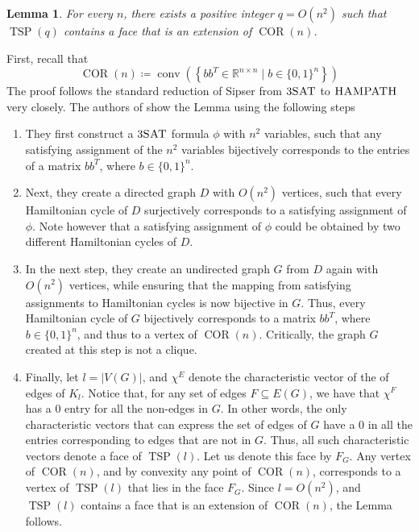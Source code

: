 \documentclass{article}
\newtheorem{lemma}[theorem]{\sc Lemma}
\theoremstyle{definition}
\theoremstyle{remark}
\newenvironment{proofsketch}{%
  \renewcommand{\proofname}{Proof Sketch}\proof}{\endproof}
\newcommand{\conv}{\operatorname{conv}}
\newcommand{\TSP}{\operatorname{TSP}}
\newcommand{\COR}{\operatorname{COR}}
\renewcommand{\R}{\mathbb{R}}
\def\problem#1{\textsc{#1}}
\def\HAMPATH{\problem{HAMPATH}\xspace}
\def\THREESAT{\problem{$3$SAT}\xspace}
\begin{document}
\begin{lemma}\label{lem:tsp-reduct}
For every $n$, there exists a positive integer $q = O(n^2)$ such that $\TSP(q)$ contains a face that is an extension of $\COR(n)$.
\end{lemma}
\begin{proofsketch}
First, recall that
\[
\COR(n) \coloneqq \conv\left( \left\{ bb^T \in \R^{n \times n} \mid b \in {\{0, 1\}}^n \right\} \right)
\]
The proof follows the standard reduction of Sipser \cite{sipser} from $\THREESAT$ to $\HAMPATH$ very closely. The authors of \cite{fiorini} show the Lemma using the following steps
\begin{enumerate}
\item They first construct a $\THREESAT$ formula $\phi$ with $n^2$ variables, such that any satisfying assignment of the $n^2$ variables bijectively corresponds to the entries of a matrix $b b^T$, where $b \in {\{0, 1\}}^n$.

\item Next, they create a directed graph $D$ with $O(n^2)$ vertices, such that every Hamiltonian cycle of $D$ surjectively corresponds to a satisfying assignment of $\phi$. Note however that a satisfying assignment of $\phi$ could be obtained by two different Hamiltonian cycles of $D$.

\item In the next step, they create an undirected graph $G$ from $D$ again with $O(n^2)$ vertices, while ensuring that the mapping from satisfying assignments to Hamiltonian cycles is now bijective in $G$. Thus, every Hamiltonian cycle of $G$ bijectively corresponds to a matrix $b b^T$, where $b \in {\{0, 1\}}^n$, and thus to a vertex of $\COR(n)$. Critically, the graph $G$ created at this step is not a clique.

\item Finally, let $l = |V(G)|$, and $\chi^E$ denote the characteristic vector of the of edges of $K_l$. Notice that, for any set of edges $F \subseteq E(G)$, we have that $\chi^F$ has a $0$ entry for all the non-edges in $G$. In other words, the only characteristic vectors that can express the set of edges of $G$ have a $0$ in all the entries corresponding to edges that are not in $G$. Thus, all such characteristic vectors denote a face of $\TSP(l)$. Let us denote this face by $F_G$. Any vertex of $\COR(n)$, and by convexity any point of $\COR(n)$, corresponds to a vertex of $\TSP(l)$ that lies in the face $F_G$. Since $l = O(n^2)$, and $\TSP(l)$ contains a face that is an extension of $\COR(n)$, the Lemma follows.
\end{enumerate}
\end{proofsketch}
\end{document}
